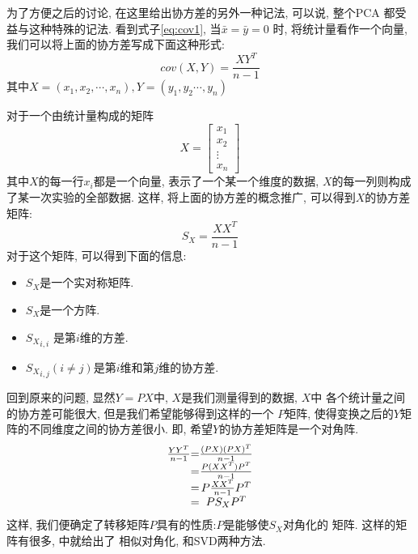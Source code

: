 \documentclass[fleqn,10pt]{SelfArx} %
\begin{document}
		为了方便之后的讨论, 在这里给出协方差的另外一种记法, 可以说, 整个PCA
		都受益与这种特殊的记法. 看到式子\ref{eq:cov1}, 当$\bar{x} = \bar{y} = 0$
		时, 将统计量看作一个向量, 我们可以将上面的协方差写成下面这种形式:
		\begin{equation}
			cov(X, Y) = \frac{XY^T}{n-1}
			\label{eq:cov2}
		\end{equation}
		其中$X = (x_1, x_2, \cdots, x_n), Y = (y_1, y_2 \cdots, y_n)$

		对于一个由统计量构成的矩阵
		\begin{equation}
			X = \left[
				\begin{array}{c}
					x_1 \\
					x_2 \\
					\vdots \\
					x_n
				\end{array}
			\right]
		\end{equation}
		其中$X$的每一行$x_i$都是一个向量, 表示了一个某一个维度的数据,
	   	$X$的每一列则构成了某一次实验的全部数据.
		这样, 将上面的协方差的概念推广, 可以得到$X$的协方差矩阵:
		\begin{equation}
			S_X = \frac{XX^T}{n-1}
		\end{equation}
		对于这个矩阵, 可以得到下面的信息:
		\begin{itemize}
			\item $S_X$是一个实对称矩阵.
			\item $S_X$是一个方阵.
			\item ${S_X}_{i,i}$ 是第$i$维的方差.
			\item ${S_X}_{i,j}(i \not= j)$是第$i$维和第$j$维的协方差.
		\end{itemize}

		回到原来的问题, 显然$Y = PX$中, $X$是我们测量得到的数据, $X$中
		各个统计量之间的协方差可能很大, 但是我们希望能够得到这样的一个
		$P$矩阵, 使得变换之后的$Y$矩阵的不同维度之间的协方差很小.
		即, 希望$Y$的协方差矩阵是一个对角阵.
		\begin{equation}
			\begin{array}{c@{=}c}
				\frac{YY^T}{n-1} & \frac{(PX)(PX)^T}{n-1} \\
				& \frac{P(XX^T)P^T}{n-1} \\
				& P\frac{XX^T}{n-1}P^T \\
				& PS_XP^T
			\end{array}
		\end{equation}
		这样, 我们便确定了转移矩阵$P$具有的性质:$P$是能够使$S_X$对角化的
		矩阵. 这样的矩阵有很多, \cite{princetonPCA:25:2003}中就给出了
		相似对角化, 和SVD两种方法. 
\end{document}
